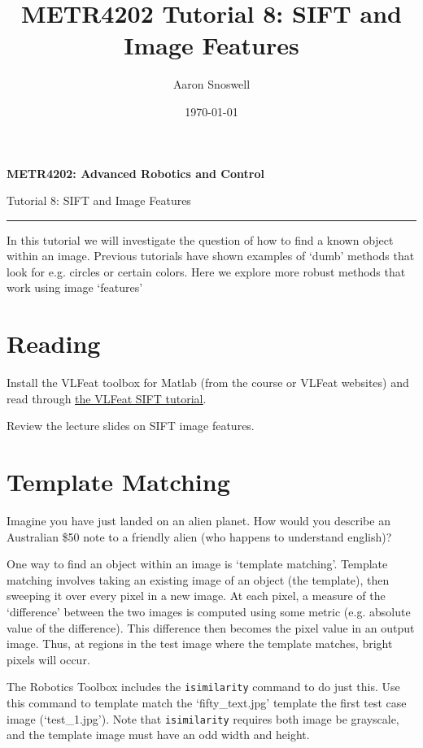 \documentclass{article}
\title{METR4202 Tutorial 8: SIFT and Image Features}
\author{Aaron Snoswell}
\date{\today}
\newcommand{\ruleline}{
	\vspace{2.5mm}
	\hrule
	\vspace{2.5mm}
}
\newcommand{\inlinecodez}[1]{\colorbox{codegray}{\texttt{\small#1}}}
\begin{document}
\begin{center}

	\large{
		\textbf{METR4202: Advanced Robotics and Control}
	}

	\vspace{0.2cm}

	Tutorial 8: SIFT and Image Features

	\ruleline

\end{center}



\setlength{\parindent}{0cm}
\setlength{\parskip}{0.35cm}
\raggedright

In this tutorial we will investigate the question of how to find a known object within an image.
Previous tutorials have shown examples of `dumb' methods that look for e.g. circles or certain colors.
Here we explore more robust methods that work using image `features'


\section{Reading}

Install the VLFeat toolbox for Matlab (from the course or VLFeat websites) and read through \href{http://www.vlfeat.org/overview/sift.html}{\underline{the VLFeat SIFT tutorial}}.

Review the lecture slides on SIFT image features.

\section{Template Matching}

Imagine you have just landed on an alien planet.
How would you describe an Australian \$50 note to a friendly alien (who happens to understand english)?

One way to find an object within an image is `template matching'.
Template matching involves taking an existing image of an object (the template), then sweeping it over every pixel in a new image.
At each pixel, a measure of the `difference' between the two images is computed using some metric (e.g. absolute value of the difference).
This difference then becomes the  pixel value in an output image.
Thus, at regions in the test image where the template matches, bright pixels will occur.

The Robotics Toolbox includes the \inlinecodez{isimilarity} command to do just this.
Use this command to template match the `fifty\_text.jpg' template the first test case image (`test\_1.jpg').
Note that \inlinecodez{isimilarity} requires both image be grayscale, and the template image must have an odd width and height.
\end{document}
